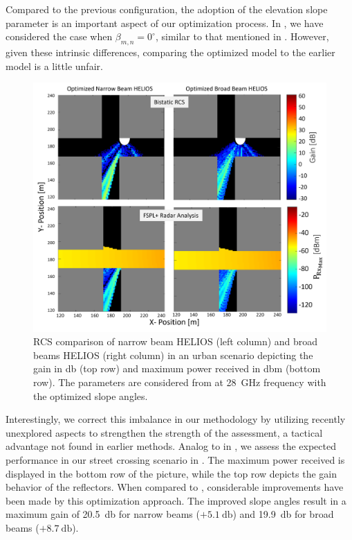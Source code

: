 Compared to the previous configuration, the adoption of the elevation slope parameter is an important aspect of our optimization process. In , we have considered the case when $\beta_{m,n}=0^\circ$, similar to that mentioned in \cite{Helios}. However, given these intrinsic differences, comparing the optimized model to the earlier model is a little unfair. 
\begin{figure}[H]
	\centering
	\includegraphics[width=0.8\linewidth]{images/Section 4 Images/urbanscenario_optimzedvalues}
	\caption{RCS comparison of narrow beam HELIOS (left column) and broad beams HELIOS (right column) in an urban scenario depicting the gain in \si{\decibel} (top row) and maximum power received in \si{\decibel}m (bottom row). The parameters are considered from  at \SI{28}{\giga\hertz} frequency with the optimized slope angles.}
	\label{fig:urbanscenario_optimzedvalues}
\end{figure}
Interestingly, we correct this imbalance in our methodology by utilizing recently unexplored aspects to strengthen the strength of the assessment, a tactical advantage not found in earlier methods. Analog to  in , we assess the expected performance in our street crossing scenario in . The maximum power received is displayed in the bottom row of the picture, while the top row depicts the gain behavior of the reflectors. When compared to , considerable improvements have been made by this optimization approach. The improved slope angles result in a maximum gain of \SI{20.5}{\decibel} for narrow beams ($+\SI{5.1}{\decibel}$) and \SI{19.9}{\decibel} for broad beams ($+\SI{8.7}{\decibel}$).

